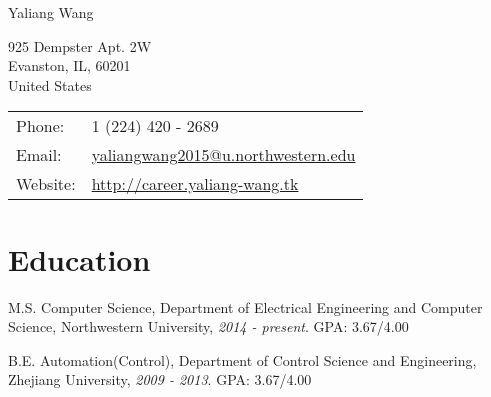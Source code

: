 \documentclass[letterpaper]{article}
\def\name{Yaliang Wang}
\renewenvironment{itemize}{
  \begin{list}{}{
    \setlength{\leftmargin}{1.5em}
  }
}{
  \end{list}
}
\begin{document}
{\huge \name}


\vspace{0.25in}

\begin{minipage}{0.45\linewidth}
  925 Dempster Apt. 2W \\
  Evanston, IL, 60201 \\
  United States 
  
\end{minipage}
\begin{minipage}{0.45\linewidth}
  \begin{tabular}{ll}
    Phone: & 1 (224) 420 - 2689 \\
    Email: & \href{mailto:yaliangwang2015@u.northwestern.edu}{yaliangwang2015@u.northwestern.edu} \\
    Website: & \href{http://career.yaliang-wang.tk}{http://career.yaliang-wang.tk} \\
  \end{tabular}
\end{minipage}


%

%

\section*{Education}

\begin{itemize}
  \item M.S. Computer Science, Department of Electrical Engineering and Computer Science, Northwestern University, {\it 2014 - present}. {\color[rgb]{0.2, 0.7, 0.7} GPA: 3.67/4.00}
  \item B.E. Automation(Control), Department of Control Science and Engineering, Zhejiang University, {\it 2009 - 2013}. {\color[rgb]{0.2, 0.7, 0.7} GPA: 3.67/4.00}
\end{itemize}
\end{document}
